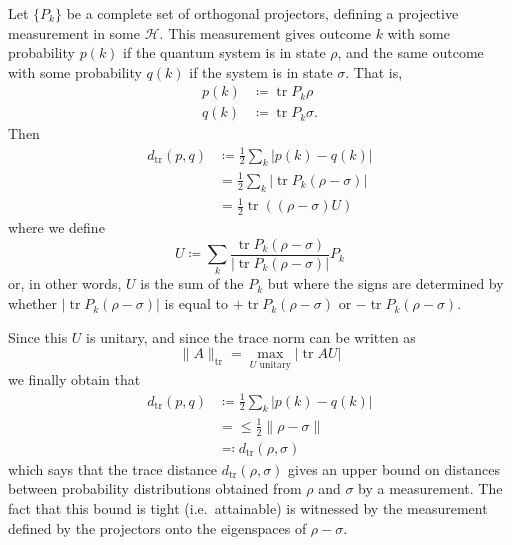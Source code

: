 \documentclass[fleqn,a4paper]{article}
\renewcommand{\footnote}[1]{\sidenotetext[{\color{white}0}\!\!]{\footnotesize #1}}
\theoremstyle{definition}
\theoremstyle{definition}
\theoremstyle{definition}
\theoremstyle{definition}
\theoremstyle{remark}
\begin{document}
Let \(\{P_k\}\) be a complete set of orthogonal projectors, defining a projective measurement in some \(\mathcal{H}\).
This measurement gives outcome \(k\) with some probability \(p(k)\) if the quantum system is in state \(\rho\), and the same outcome with some probability \(q(k)\) if the system is in state \(\sigma\).
That is,
\[
  \begin{aligned}
    p(k) &\coloneqq \operatorname{tr}P_k\rho
  \\q(k) &\coloneqq \operatorname{tr}P_k\sigma.
  \end{aligned}
\]
Then
\[
  \begin{aligned}
    d_{\operatorname{tr}}(p,q)
    &\coloneqq \frac{1}{2}\sum_k|p(k)-q(k)|
  \\&= \frac{1}{2}\sum_k|\operatorname{tr}P_k(\rho-\sigma)|
  \\&= \frac{1}{2}\operatorname{tr}((\rho-\sigma)U)
  \end{aligned}
\]
where we define
\[
  U\coloneqq \sum_k\frac{\operatorname{tr}P_k(\rho-\sigma)}{|\operatorname{tr}P_k(\rho-\sigma)|}P_k
\]
or, in other words, \(U\) is the sum of the \(P_k\) but where the signs are determined by whether \(|\operatorname{tr}P_k(\rho-\sigma)|\) is equal to \(+\operatorname{tr}P_k(\rho-\sigma)\) or \(-\operatorname{tr}P_k(\rho-\sigma)\).

Since this \(U\) is unitary, and since the trace norm can be written as\footnote{See Section \ref{more-operator-norms}.}
\[
  \|A\|_{\operatorname{tr}} = \max_{U\text{ unitary}}|\operatorname{tr}AU|
\]
we finally obtain that
\[
  \begin{aligned}
    d_{\operatorname{tr}}(p,q)
    &\coloneqq \frac{1}{2}\sum_k|p(k)-q(k)|
  \\&= \leqslant\frac{1}{2}\|\rho-\sigma\|
  \\&\eqqcolon d_{\operatorname{tr}}(\rho,\sigma)
  \end{aligned}
\]
which says that the trace distance \(d_{\operatorname{tr}}(\rho,\sigma)\) gives an upper bound on distances between probability distributions obtained from \(\rho\) and \(\sigma\) by a measurement.
The fact that this bound is tight (i.e.~attainable) is witnessed by the measurement defined by the projectors onto the eigenspaces of \(\rho-\sigma\).
\end{document}
